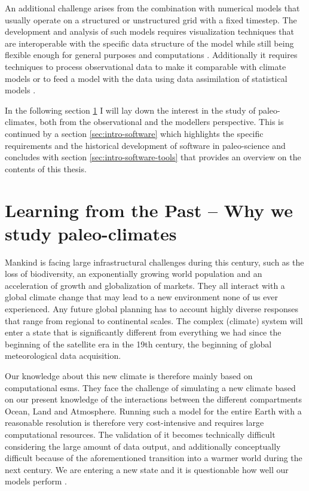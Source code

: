 \begin{refsection}
An additional challenge arises from the combination with numerical models that usually operate on a structured \citep{Edwards2010,TreutSomervilleCubaschEtAl2007} or unstructured \addref[ICON] grid with a fixed timestep. The development and analysis of such models requires visualization techniques that are interoperable with the specific data structure of the model \citep[e.g.][]{RewDavis1990, BrownFolkGoucherEtAl1993} while still being flexible enough for general purposes and computations \citep{Sommer2017, HoyerHamman2017}. Additionally it requires techniques to process observational data to make it comparable with climate models \citep{MauriDavisCollinsEtAl2015}  or to feed a model with the data using data assimilation of statistical models \citep{SommerKaplan2017b}.

In the following section \ref{sec:intro-paleo} I will lay down the interest in the study of paleo-climates, both from the observational and the modellers perspective. This is continued by a section \ref{sec:intro-software} which highlights the specific requirements and the historical development of software in paleo-science and concludes with section \ref{sec:intro-software-tools} that provides an overview on the contents of this thesis.

\section{Learning from the Past – Why we study paleo-climates} \label{sec:intro-paleo}

Mankind is facing large infrastructural challenges during this century, such as the loss of biodiversity\addref, an exponentially growing world population \addref and an acceleration of growth and globalization of markets. They all interact with a global climate change that may lead to a new environment none of us ever experienced. Any future global planning has to account highly diverse responses that range from regional to continental scales. The complex (climate) system will enter a state that is significantly different from everything we had since the beginning of the satellite era in the 19th century, the beginning of global meteorological data acquisition\addref.

Our knowledge about this new climate is therefore mainly based on computational \glspl{esm}. They face the challenge of simulating a new climate based on our present knowledge of the interactions between the different compartments Ocean, Land and Atmosphere. Running such a model for the entire Earth with a reasonable resolution is therefore very cost-intensive and requires large computational resources. The validation of it becomes technically difficult considering the large amount of data output, and additionally conceptually difficult because of the aforementioned transition into a warmer world during the next century. We are entering a new state and it is questionable how well our models perform \citep{UldenOldenborgh2006, Karpechko2010, HargreavesAnnanOhgaitoEtAl2013}.


\end{refsection}
